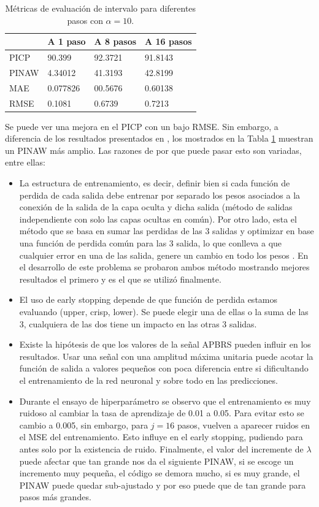 \documentclass[12pt]{article}
\begin{document}
\begin{table}[h!]
	\centering
	\caption{Métricas de evaluación de intervalo para diferentes pasos con $\alpha = 10$.}
	\begin{tabular}{|l|l|l|l|}
		\hline
		& A 1 paso &A 8 pasos & A 16 pasos \\\hline
		PICP     &  90.399   &  92.3721   & 91.8143   \\ \hline
		PINAW    & 4.34012   & 41.3193    & 42.8199    \\ \hline
		MAE & 0.077826&00.5676 & 0.60138\\ \hline
		RMSE & 0.1081&0.6739&0.7213\\ \hline
	\end{tabular}
	\label{tab_js}
\end{table}

Se puede ver una mejora en el PICP con un bajo RMSE. Sin embargo, a diferencia de los resultados presentados en \cite{cruz_neural_2018}, los mostrados en la Tabla \ref{tab_js} muestran un PINAW más amplio. Las razones de por que puede pasar esto son variadas, entre ellas:
\begin{itemize}
	\item La estructura de entrenamiento, es decir, definir bien si cada función de perdida de cada salida debe entrenar por separado los pesos asociados a la conexión de la salida de la capa oculta y dicha salida (método de salidas independiente con solo las capas ocultas en común). Por otro lado, esta el método que se basa en sumar las perdidas de las 3 salidas y optimizar en base una función de perdida común para las 3 salida, lo que conlleva a que cualquier error en una de las salida, genere un cambio en todo los pesos \cite{noauthor_multi-task_nodate}. En el desarrollo de este problema se probaron ambos método mostrando mejores resultados el primero y es el que se utilizó finalmente.
	\item El uso de early stopping depende de que función de perdida estamos evaluando (upper, crisp, lower). Se puede elegir una de ellas o la suma de las 3, cualquiera de las dos tiene un impacto en las otras 3 salidas.
	\item Existe la hipótesis de que los valores de la señal APBRS pueden influir en los resultados. Usar una señal con una amplitud máxima unitaria puede acotar la función de salida a valores pequeños con poca diferencia entre si dificultando el entrenamiento de la red neuronal y sobre todo en las predicciones.
	\item Durante el ensayo de hiperparámetro se observo que el entrenamiento es muy ruidoso al cambiar la tasa de aprendizaje de 0.01 a 0.05. Para evitar esto se cambio a 0.005, sin embargo, para $j=16$ pasos, vuelven a aparecer ruidos en el MSE del entrenamiento. Esto influye en el early stopping, pudiendo para antes solo por la existencia de ruido. 
	Finalmente, el valor del incremente de $\lambda$ puede afectar que tan grande nos da el siguiente PINAW, si se escoge un incremento muy pequeña, el código se demora mucho, si es muy grande, el PINAW puede quedar sub-ajustado y por eso puede que de tan grande para pasos más grandes.
\end{itemize} 
\end{document}
